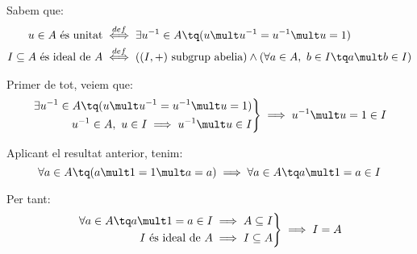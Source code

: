 Sabem que:
\[\begin{aligned}
	u \in A \text{ és unitat}		& \overset{def}{\iff} \exists u^{-1} \in A \tq (u \mult u^{-1} = u^{-1} \mult u = 1) \\
	I \subseteq A \text{ és ideal de } A	& \overset{def}{\iff} ((I,+) \text{ subgrup abelia}) \land (\forall a \in A,~b \in I \tq a \mult b \in I) \\
\end{aligned}\]

Primer de tot, veiem que:
\[\left.\begin{aligned}
	\exists u^{-1} \in A \tq (u \mult u^{-1} = u^{-1} \mult u = 1) \\
	u^{-1} \in A,~u \in I \implies u^{-1} \mult u \in I
\end{aligned}\right\} \implies u^{-1} \mult u = 1 \in I\]

Aplicant el resultat anterior, tenim:
\[\forall a \in A \tq (a \mult 1 = 1 \mult a = a) \implies \forall a \in A \tq a \mult 1 = a \in I\]

Per tant:
\[\left.\begin{aligned}
	\forall a \in A \tq a \mult 1 = a \in I \implies A \subseteq I \\
	I \text{ és ideal de } A \implies I \subseteq A
\end{aligned}\right\} \implies I = A\]
